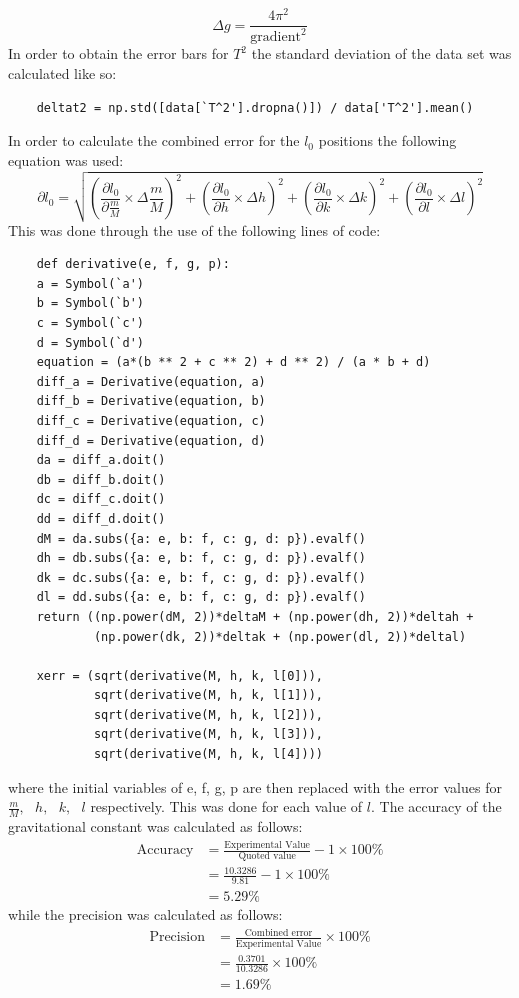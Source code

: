 \documentclass[12pt, a4paper]{article}
\begin{document}
\begin{equation}\label{eqn: grav error}
    \Delta g = \frac{4\pi ^2}{\text{gradient}^2}
\end{equation}
In order to obtain the error bars for $T^2$ the standard deviation of the data set was calculated like so:
\begin{verbatim}
    deltat2 = np.std([data[`T^2'].dropna()]) / data['T^2'].mean()
\end{verbatim}
In order to calculate the combined error for the $l_0$ positions the following equation was used:
\begin{equation}\label{eqn: combined error}
    \partial l_0 = \sqrt{(\frac{\partial l_0}{\partial \frac{m}{M}}\times \Delta \frac{m}{M})^2 + (\frac{\partial l_0}{\partial h} \times \Delta h)^2 + (\frac{\partial l_0}{\partial k} \times \Delta k)^2 + (\frac{\partial l_0}{\partial l} \times \Delta l)^2}
\end{equation}
This was done through the use of the following lines of code:
\begin{verbatim}
    def derivative(e, f, g, p):
    a = Symbol(`a')
    b = Symbol(`b')
    c = Symbol(`c')
    d = Symbol(`d')
    equation = (a*(b ** 2 + c ** 2) + d ** 2) / (a * b + d)
    diff_a = Derivative(equation, a)
    diff_b = Derivative(equation, b)
    diff_c = Derivative(equation, c)
    diff_d = Derivative(equation, d)
    da = diff_a.doit()
    db = diff_b.doit()
    dc = diff_c.doit()
    dd = diff_d.doit()
    dM = da.subs({a: e, b: f, c: g, d: p}).evalf()
    dh = db.subs({a: e, b: f, c: g, d: p}).evalf()
    dk = dc.subs({a: e, b: f, c: g, d: p}).evalf()
    dl = dd.subs({a: e, b: f, c: g, d: p}).evalf()
    return ((np.power(dM, 2))*deltaM + (np.power(dh, 2))*deltah +     
            (np.power(dk, 2))*deltak + (np.power(dl, 2))*deltal)
            
    xerr = (sqrt(derivative(M, h, k, l[0])), 
            sqrt(derivative(M, h, k, l[1])), 
            sqrt(derivative(M, h, k, l[2])), 
            sqrt(derivative(M, h, k, l[3])), 
            sqrt(derivative(M, h, k, l[4])))
\end{verbatim}
where the initial variables of e, f, g, p are then replaced with the error values for $\frac{m}{M},\text{ }h,\text{ }k,\text{ }l$ respectively. This was done for each value of $l$. The accuracy of the gravitational constant was calculated as follows:
\begin{align*}
    \text{Accuracy} &= \frac{\text{Experimental Value}}{\text{Quoted value}}-1 \times 100\% \\
    &= \frac{10.3286}{9.81}-1 \times 100\% \\
    &= 5.29\%
\end{align*}
while the precision was calculated as follows:
\begin{align*}
    \text{Precision} &= \frac{\text{Combined error}}{\text{Experimental Value}} \times 100\% \\
    &= \frac{0.3701}{10.3286} \times 100\% \\
    &= 1.69\%
\end{align*}
\end{document}
